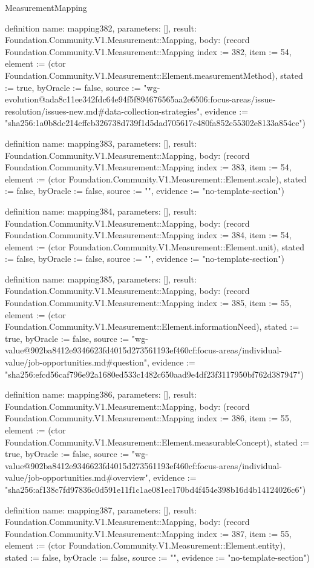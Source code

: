 \begin{lexlean}{MeasurementMapping}
\begin{semanticmodule}
definition{
  name: mapping382,
  parameters: [],
  result: Foundation.Community.V1.Measurement::Mapping,
  body: (record Foundation.Community.V1.Measurement::Mapping {index := 382, item := 54, element := (ctor Foundation.Community.V1.Measurement::Element.measurementMethod), stated := true, byOracle := false, source := "wg-evolution@ada8c11ee342fdc64e94f5f894676565aa2e6506:focus-areas/issue-resolution/issues-new.md#data-collection-strategies", evidence := "sha256:1a0b8dc214cffcb326738d739f1d5dad705617c480fa852c55302e8133a854ce"})
}

definition{
  name: mapping383,
  parameters: [],
  result: Foundation.Community.V1.Measurement::Mapping,
  body: (record Foundation.Community.V1.Measurement::Mapping {index := 383, item := 54, element := (ctor Foundation.Community.V1.Measurement::Element.scale), stated := false, byOracle := false, source := "", evidence := "no-template-section"})
}

definition{
  name: mapping384,
  parameters: [],
  result: Foundation.Community.V1.Measurement::Mapping,
  body: (record Foundation.Community.V1.Measurement::Mapping {index := 384, item := 54, element := (ctor Foundation.Community.V1.Measurement::Element.unit), stated := false, byOracle := false, source := "", evidence := "no-template-section"})
}

definition{
  name: mapping385,
  parameters: [],
  result: Foundation.Community.V1.Measurement::Mapping,
  body: (record Foundation.Community.V1.Measurement::Mapping {index := 385, item := 55, element := (ctor Foundation.Community.V1.Measurement::Element.informationNeed), stated := true, byOracle := false, source := "wg-value@902ba8412e9346623fd4015d273561193ef460cf:focus-areas/individual-value/job-opportunities.md#question", evidence := "sha256:efcd56caf796e92a1680ed533c1482c650aad9e4df23f3117950bf762d387947"})
}

definition{
  name: mapping386,
  parameters: [],
  result: Foundation.Community.V1.Measurement::Mapping,
  body: (record Foundation.Community.V1.Measurement::Mapping {index := 386, item := 55, element := (ctor Foundation.Community.V1.Measurement::Element.measurableConcept), stated := true, byOracle := false, source := "wg-value@902ba8412e9346623fd4015d273561193ef460cf:focus-areas/individual-value/job-opportunities.md#overview", evidence := "sha256:af138c7fd97836c0d591e11f1c1ae081ec170bd4f454e398b16d4b14124026c6"})
}

definition{
  name: mapping387,
  parameters: [],
  result: Foundation.Community.V1.Measurement::Mapping,
  body: (record Foundation.Community.V1.Measurement::Mapping {index := 387, item := 55, element := (ctor Foundation.Community.V1.Measurement::Element.entity), stated := false, byOracle := false, source := "", evidence := "no-template-section"})
}


\end{semanticmodule}
\end{lexlean}
